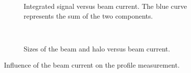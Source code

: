 \begin{figure}[!ht]
  \begin{subfigure}[t]{0.5\textwidth}
    
    \caption{Integrated signal versus beam current. The blue curve represents the sum of the two components.}
    \label{}
  \end{subfigure}
  ~
  \begin{subfigure}[t]{0.5\textwidth}
    
    \caption{Sizes of the beam and halo versus beam current.}
    \label{}
  \end{subfigure}
  \caption[Influence of the beam current on the profile measurement.]{Influence of the beam current on the profile measurement.}
  \label{chap4:current_sweep}
\end{figure}
